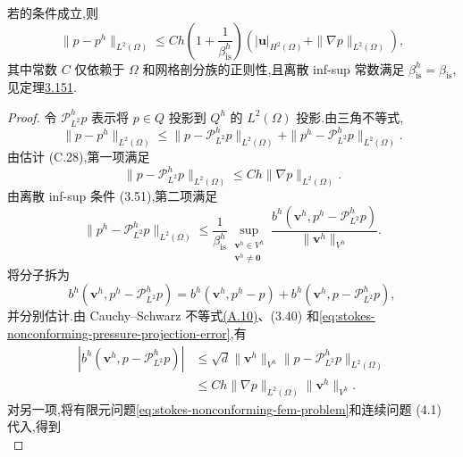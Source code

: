 \begin{theorem}\label{thm:stokes-nonconforming-pressure-error}
若的条件成立,则
\begin{equation}\label{eq:stokes-nonconforming-pressure-error}
  \|p-p^h\|_{L^2(\Omega)}
  \leq Ch\left(1+\frac1{\beta_{\mathrm{is}}^h}\right)
       \left(|\bm{u}|_{H^2(\Omega)}
       +\|\nabla p\|_{L^2(\Omega)}\right),
\end{equation}
其中常数 $C$ 仅依赖于 $\Omega$ 和网格剖分族的正则性,且离散 inf-sup 常数满足 $\beta_{\mathrm{is}}^h=\beta_{\mathrm{is}}$,见定理\hyperref[thm:crouzeix-raviart-infsup]{3.151}.
\end{theorem}
\begin{proof}
令 $\mathcal{P}_{L^2}^h p$ 表示将 $p\in Q$ 投影到 $Q^h$ 的 $L^2(\Omega)$ 投影.由三角不等式,
\[
  \|p-p^h\|_{L^2(\Omega)}
  \leq\|p-\mathcal{P}_{L^2}^hp\|_{L^2(\Omega)}
      +\|p^h-\mathcal{P}_{L^2}^hp\|_{L^2(\Omega)}.
\]
由估计 (C.28),第一项满足
\begin{equation}\label{eq:stokes-nonconforming-pressure-projection-error}
  \|p-\mathcal{P}_{L^2}^hp\|_{L^2(\Omega)}
  \leq Ch\|\nabla p\|_{L^2(\Omega)}.
\end{equation}
由离散 inf-sup 条件 (3.51),第二项满足
\begin{equation}\label{eq:stokes-nonconforming-pressure-infsup}
  \|p^h-\mathcal{P}_{L^2}^hp\|_{L^2(\Omega)}
  \leq\frac1{\beta_{\mathrm{is}}^h}
   \sup_{\substack{\bm{v}^h\in V^h\\\bm{v}^h\ne\bm{0}}}
   \frac{b^h(\bm{v}^h,p^h-\mathcal{P}_{L^2}^hp)}
        {\|\bm{v}^h\|_{V^h}}.
\end{equation}
将分子拆为
\[
 b^h(\bm{v}^h,p^h-\mathcal{P}_{L^2}^hp)
 =b^h(\bm{v}^h,p^h-p)
  +b^h(\bm{v}^h,p-\mathcal{P}_{L^2}^hp),
\]
并分别估计.由 Cauchy--Schwarz 不等式\hyperref[eq:appendix-a-10]{(A.10)}、(3.40) 和\cref{eq:stokes-nonconforming-pressure-projection-error},有
\begin{equation}\label{eq:stokes-nonconforming-pressure-projection-term}
\begin{aligned}
  |b^h(\bm{v}^h,p-\mathcal{P}_{L^2}^hp)|
  &\leq\sqrt d\|\bm{v}^h\|_{V^h}
      \|p-\mathcal{P}_{L^2}^hp\|_{L^2(\Omega)}\\
  &\leq Ch\|\nabla p\|_{L^2(\Omega)}\|\bm{v}^h\|_{V^h}.
\end{aligned}
\end{equation}
对另一项,将有限元问题\cref{eq:stokes-nonconforming-fem-problem}和连续问题 (4.1) 代入,得到
\begin{equation}\label{eq:stokes-nonconforming-pressure-error-identity}

\end{equation}
\end{proof}
